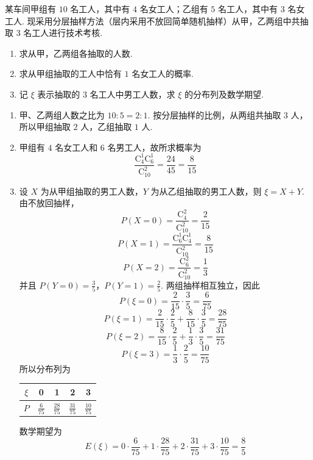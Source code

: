 \begin{problem}
某车间甲组有 \(10\text{ 名}\)工人，其中有 \(4\text{ 名}\)女工人；乙组有 \(5\text{ 名}\)工人，其中有 \(3\text{ 名}\)女工人. 现采用分层抽样方法（层内采用不放回简单随机抽样）从甲，乙两组中共抽取 \(3\text{ 名}\)工人进行技术考核.

\begin{enumerate}
\item 求从甲，乙两组各抽取的人数.
\item 求从甲组抽取的工人中恰有 \(1\text{ 名}\)女工人的概率.
\item 记 \(\xi\) 表示抽取的 \(3\text{ 名}\)工人中男工人数，求 \(\xi\) 的分布列及数学期望.
\end{enumerate}

\begin{solution}
\begin{enumerate}
\item 甲、乙两组人数之比为 \(10:5=2:1\). 按分层抽样的比例，从两组共抽取 \(3\) 人，所以甲组抽取 \(2\) 人，乙组抽取 \(1\) 人.
\item 甲组有 \(4\) 名女工人和 \(6\) 名男工人，故所求概率为
\[
\frac{\mathrm C_4^1\mathrm C_6^1}{\mathrm C_{10}^{2}}=\frac{24}{45}=\frac{8}{15}
\]
\item 设 \(X\) 为从甲组抽取的男工人数，\(Y\) 为从乙组抽取的男工人数，则 \(\xi=X+Y\). 由不放回抽样，
\[
P(X=0)=\frac{\mathrm C_4^2}{\mathrm C_{10}^{2}}=\frac{2}{15}
\]
\[
P(X=1)=\frac{\mathrm C_6^1\mathrm C_4^1}{\mathrm C_{10}^{2}}=\frac{8}{15}
\]
\[
P(X=2)=\frac{\mathrm C_6^2}{\mathrm C_{10}^{2}}=\frac13
\]
并且 \(P(Y=0)=\frac35\)，\(P(Y=1)=\frac25\). 两组抽样相互独立，因此
\[
P(\xi=0)=\frac{2}{15}\cdot\frac35=\frac{6}{75}
\]
\[
P(\xi=1)=\frac{2}{15}\cdot\frac25+\frac{8}{15}\cdot\frac35=\frac{28}{75}
\]
\[
P(\xi=2)=\frac{8}{15}\cdot\frac25+\frac13\cdot\frac35=\frac{31}{75}
\]
\[
P(\xi=3)=\frac13\cdot\frac25=\frac{10}{75}
\]
所以分布列为
\begin{center}
\begin{tabular}{c|cccc}
\(\xi\) & 0 & 1 & 2 & 3 \\
\hline
\(P\) & \(\frac{6}{75}\) & \(\frac{28}{75}\) & \(\frac{31}{75}\) & \(\frac{10}{75}\)
\end{tabular}
\end{center}
数学期望为
\[
E(\xi)=0\cdot\frac{6}{75}+1\cdot\frac{28}{75}+2\cdot\frac{31}{75}+3\cdot\frac{10}{75}=\frac85
\]
\end{enumerate}
\end{solution}
\end{problem}

